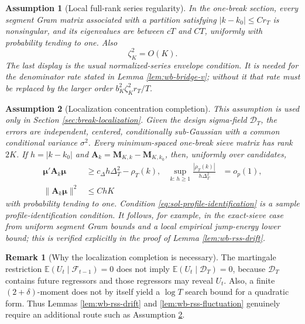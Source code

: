 \documentclass[12pt]{article}
\numberwithin{equation}{section}
\newtheorem{assumption}{Assumption}
\theoremstyle{definition}
\newtheorem{remark}{Remark}
\newcommand{\E}{\mathbb E}
\begin{document}
\begin{assumption}[Local full-rank series regularity]
\label{ass:sol-local-series}
In the one-break section, every segment Gram matrix associated with a
partition satisfying \(|k-k_0|\leq Cr_T\) is nonsingular, and its eigenvalues
are between \(cT\) and \(CT\), uniformly with probability tending to one.
Also
\begin{equation}
    \zeta_K^2=O(K).
    \label{eq:sol-regular-envelope}
\end{equation}
The last display is the usual normalized-series envelope condition.  It is
needed for the denominator rate stated in Lemma \ref{lem:wb-bridge-v}; without
it that rate must be replaced by the larger order
\(b_K^2\zeta_K^2r_T/T\).
\end{assumption}

\begin{assumption}[Localization concentration completion]
\label{ass:sol-localization}
This assumption is used only in Section \ref{sec:break-localization}.  Given
the design sigma-field \(\mathcal D_T\), the errors are independent, centered,
conditionally sub-Gaussian with a common conditional variance \(\sigma^2\).
Every minimum-spaced one-break sieve matrix has rank \(2K\).  If
\(h=|k-k_0|\) and
\(\bm A_k=\bm M_{K,k}-\bm M_{K,k_0}\), then, uniformly over candidates,
\begin{align}
    \bm\mu'\bm A_k\bm\mu
    &\geq c_\Delta h\Delta_T^2-\rho_T(k),
    &
    \sup_{k:\,h\geq1}\frac{|\rho_T(k)|}{h\Delta_T^2}&=o_p(1),
    \label{eq:sol-profile-identification}
    \\
    \|\bm A_k\bm\mu\|^2&\leq C hK
    \label{eq:sol-mean-sensitivity}
\end{align}
with probability tending to one.  Condition
\eqref{eq:sol-profile-identification} is a sample profile-identification
condition.  It follows, for example, in the exact-sieve case from uniform
segment Gram bounds and a local empirical jump-energy lower bound; this is
verified explicitly in the proof of Lemma \ref{lem:wb-rss-drift}.
\end{assumption}

\begin{remark}[Why the localization completion is necessary]
The martingale restriction
\(\E(U_t\mid\mathcal F_{t-1})=0\) does not imply
\(\E(U_t\mid\mathcal D_T)=0\), because \(\mathcal D_T\) contains future
regressors and those regressors may reveal \(U_t\).  Also, a finite
\((2+\delta)\)-moment does not by itself yield a \(\log T\) search bound for a
quadratic form.  Thus Lemmas \ref{lem:wb-rss-drift} and
\ref{lem:wb-rss-fluctuation} genuinely require an additional route such as
Assumption \ref{ass:sol-localization}.
\end{remark}
\end{document}
